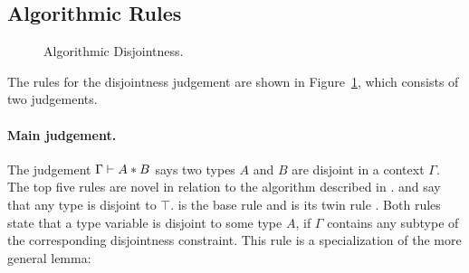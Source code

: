 \subsection{Algorithmic Rules}

\begin{figure}[!t]


  \caption{Algorithmic Disjointness.}
  \label{fig:disjointness}
\end{figure}

The rules for the disjointness judgement are shown in
Figure~\ref{fig:disjointness}, which consists of two judgements.
 
\paragraph{Main judgement.} The judgement $\Gamma \vdash A * B$ says
two types $A$ and $B$ are disjoint in a context $\Gamma$.
The top five rules are novel in relation to the algorithm described in \oldname.
 and  say that any type is disjoint to 
$\top$.
 is the base rule and  is its twin rule 
. 
Both rules state that a type variable is disjoint to some type $A$, if $\Gamma$ contains any
subtype of the corresponding disjointness constraint. 
This rule is a specialization of the more general lemma:

